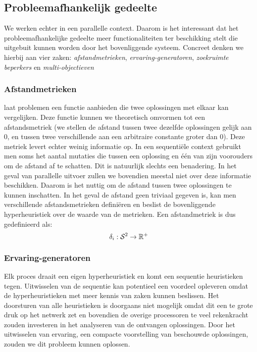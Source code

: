 \subsection{Probleemafhankelijk gedeelte}

We werken echter in een parallelle context. Daarom is het interessant dat het probleemafhankelijke gedeelte meer functionaliteiten ter beschikking stelt die uitgebuit kunnen worden door het bovenliggende systeem. Concreet denken we hierbij aan vier zaken: \emph{afstandmetrieken}, \emph{ervaring-generatoren}, \emph{zoekruimte beperkers} en \emph{multi-objectieven}

\subsubsection{Afstandmetrieken}
\abhf{} laat problemen een functie aanbieden die twee oplossingen met elkaar kan vergelijken. Deze functie kunnen we theoretisch omvormen tot een afstandsmetriek (we stellen de afstand tussen twee dezelfde oplossingen gelijk aan 0, en tussen twee verschillende aan een arbitraire constante groter dan 0). Deze metriek levert echter weinig informatie op. In een sequenti\"ele context gebruikt men soms het aantal mutaties die tussen een oplossing en \'e\'en van zijn voorouders om de afstand af te schatten. Dit is natuurlijk slechts een benadering. In het geval van parallelle uitvoer zullen we bovendien meestal niet over deze informatie beschikken. Daarom is het nuttig om de afstand tussen twee oplossingen te kunnen inschatten. In het geval de afstand geen triviaal gegeven is, kan men verschillende afstandsmetrieken defini\"eren en beslist de bovenliggende hyperheuristiek over de waarde van de metrieken. Een afstandmetriek is dus gedefinieerd als:
 \begin{equation}
  \delta_i:\mathcal{S}^2\rightarrow\mathbb{R}^+
 \end{equation}
 
\subsubsection{Ervaring-generatoren}
Elk proces draait een eigen hyperheuristiek en komt een sequentie heuristieken tegen. Uitwisselen van de sequentie kan potentieel een voordeel opleveren omdat de hyperheuristieken met meer kennis van zaken kunnen beslissen. Het doorsturen van alle heuristieken is doorgaans niet mogelijk omdat dit een te grote druk op het netwerk zet en bovendien de overige processoren te veel rekenkracht zouden investeren in het analyseren van de ontvangen oplossingen. Door het uitwisselen van ervaring, een compacte voorstelling van beschouwde oplossingen, zouden we dit probleem kunnen oplossen.

